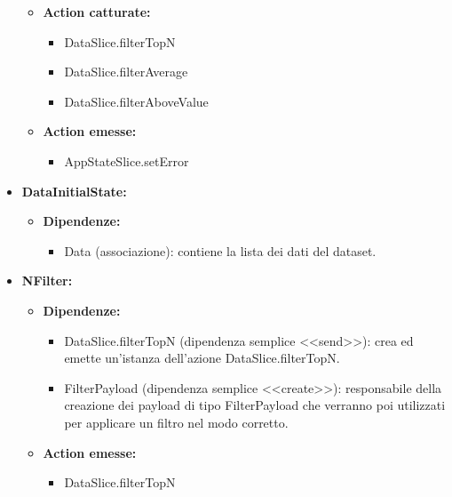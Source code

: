 \begin{itemize}
\begin{itemize}
        \item \textbf{Action catturate:}
        \begin{itemize}
            \item DataSlice.filterTopN
            \item DataSlice.filterAverage
            \item DataSlice.filterAboveValue
        \end{itemize} 
        \item \textbf{Action emesse:}
        \begin{itemize}
            \item AppStateSlice.setError
        \end{itemize} 
    \end{itemize}

    \item \textbf{DataInitialState:}
    \begin{itemize}
        \item \textbf{Dipendenze:}
        \begin{itemize}
            \item Data (associazione): contiene la lista dei dati del dataset.
        \end{itemize} 
    \end{itemize}

    \item \textbf{NFilter:}
    \begin{itemize}
        \item \textbf{Dipendenze:}
        \begin{itemize}
            \item DataSlice.filterTopN (dipendenza semplice <<send>>): crea ed emette un’istanza dell’azione DataSlice.filterTopN.
            \item FilterPayload (dipendenza semplice <<create>>): responsabile della creazione dei payload di tipo FilterPayload che verranno poi utilizzati per applicare un filtro nel modo corretto.
        \end{itemize} 
        \item \textbf{Action emesse:}
        \begin{itemize}
            \item DataSlice.filterTopN
        \end{itemize} 
    \end{itemize}


\end{itemize}
